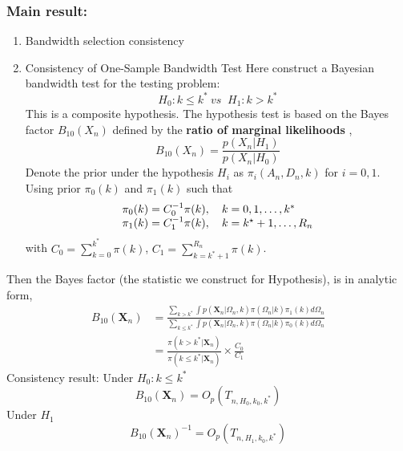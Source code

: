 \documentclass{beamer}
\begin{document}
\begin{frame}

\subsubsection{Main result:}

\begin{enumerate}
\item
  Bandwidth selection consistency
\item
  Consistency of One-Sample Bandwidth Test Here construct a Bayesian
  bandwidth test for the testing problem: \[
  H_0:k\leqslant k^* \ \textit{vs }\ H_1:k>k^* 
  \] This is a composite hypothesis. The hypothesis test is based on the
  Bayes factor \(B_{10}(X_n)\) defined by the \textbf{ratio of marginal
  likelihoods} , \[
  B_{10}(X_{n})=\frac{p(X_n|H_1)}{p(X_n|H_0)}
  \] Denote the prior under the hypothesis \(H_i\) as
  \(\pi_i(A_n,D_n,k)\) for \(i=0,1.\) Using prior \(\pi_0(k)\) and
  \(\pi_1(k)\) such that \[
  \begin{array} { l l } { \pi _ { 0 } ( k ) = C _ { 0 } ^ { - 1 } \pi ( k ) , \quad k = 0,1 , \ldots , k ^ { * } } \\ { \pi _ { 1 } ( k ) = C _ { 1 } ^ { - 1 } \pi ( k ) , \quad k = k ^ { \star } + 1 , \ldots , R _ { n } } \end{array}
  \] with \(C _ { 0 } = \sum _ { k = 0 } ^ { k ^ { * } } \pi ( k )\),
  \(C _ { 1 } = \sum _ { k = k ^ { * } + 1 } ^ { R _ { n } } \pi ( k )\).
\end{enumerate}

\end{frame}

\begin{frame}
Then the Bayes factor (the statistic we construct for Hypothesis), is
  in analytic form, \[
  \begin{aligned} B _ { 10 } \left( \mathbf { X } _ { n } \right) & = \frac { \sum _ { k > k ^ { * } } \int p \left( \mathbf { X } _ { n } | \Omega _ { n } , k \right) \pi \left( \Omega _ { n } | k \right) \pi _ { 1 } ( k ) d \Omega _ { n } } { \sum _ { k \leq k ^ { * } } \int p \left( \mathbf { X } _ { n } | \Omega _ { n } , k \right) \pi \left( \Omega _ { n } | k \right) \pi _ { 0 } ( k ) d \Omega _ { n } } \\ & = \frac { \pi \left( k > k ^ { * } | \mathbf { X } _ { n } \right) } { \pi \left( k \leq k ^ { * } | \mathbf { X } _ { n } \right) } \times \frac { C _ { 0 } } { C _ { 1 } } \end{aligned}
  \] Consistency result: Under \(H_0:k\leq k^*\) \[
  B _ { 10 } \left( \mathbf { X } _ { n } \right) = O _ { p } \left( T _ { n , H _ { 0 } , k _ { 0 } , k ^ { * } } \right)
  \] Under \(H_1\) \[
  B _ { 10 } \left( \mathbf { X } _ { n } \right) ^ { - 1 } = O _ { p } \left( T _ { n , H _ { 1 } , k _ { 0 } , k ^ { * } } \right)
  \]
\end{frame}
\end{document}
